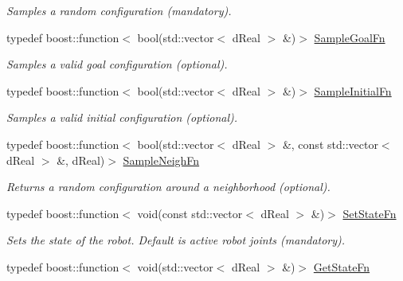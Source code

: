\begin{DoxyCompactItemize}
\begin{DoxyCompactList}\small\item\em Samples a random configuration (mandatory). \item\end{DoxyCompactList}\item 
typedef boost::function$<$ bool(std::vector$<$ dReal $>$ \&)$>$ \hyperlink{classOpenRAVE_1_1PlannerBase_1_1PlannerParameters_a60329a58cd803c66dc0701e9944d8ed9}{SampleGoalFn}
\begin{DoxyCompactList}\small\item\em Samples a valid goal configuration (optional). \item\end{DoxyCompactList}\item 
typedef boost::function$<$ bool(std::vector$<$ dReal $>$ \&)$>$ \hyperlink{classOpenRAVE_1_1PlannerBase_1_1PlannerParameters_a8cd1af608ebe03bf544992b322e6f5aa}{SampleInitialFn}
\begin{DoxyCompactList}\small\item\em Samples a valid initial configuration (optional). \item\end{DoxyCompactList}\item 
typedef boost::function$<$ bool(std::vector$<$ dReal $>$ \&, const std::vector$<$ dReal $>$ \&, dReal)$>$ \hyperlink{classOpenRAVE_1_1PlannerBase_1_1PlannerParameters_a78bb26c318f93bce6e3ea11fc95a99fc}{SampleNeighFn}
\begin{DoxyCompactList}\small\item\em Returns a random configuration around a neighborhood (optional). \item\end{DoxyCompactList}\item 
\hypertarget{classOpenRAVE_1_1PlannerBase_1_1PlannerParameters_a8f178813af84b26eb8a12ade9a556482}{
typedef boost::function$<$ void(const std::vector$<$ dReal $>$ \&)$>$ \hyperlink{classOpenRAVE_1_1PlannerBase_1_1PlannerParameters_a8f178813af84b26eb8a12ade9a556482}{SetStateFn}}
\label{classOpenRAVE_1_1PlannerBase_1_1PlannerParameters_a8f178813af84b26eb8a12ade9a556482}

\begin{DoxyCompactList}\small\item\em Sets the state of the robot. Default is active robot joints (mandatory). \item\end{DoxyCompactList}\item 
\hypertarget{classOpenRAVE_1_1PlannerBase_1_1PlannerParameters_ae2be23760038f12a589f6a8cfb0a5780}{
typedef boost::function$<$ void(std::vector$<$ dReal $>$ \&)$>$ \hyperlink{classOpenRAVE_1_1PlannerBase_1_1PlannerParameters_ae2be23760038f12a589f6a8cfb0a5780}{GetStateFn}}
\label{classOpenRAVE_1_1PlannerBase_1_1PlannerParameters_ae2be23760038f12a589f6a8cfb0a5780}


\end{DoxyCompactItemize}
